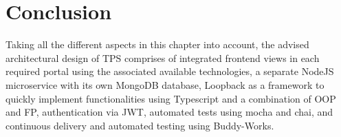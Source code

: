 %
\section{Conclusion}
Taking all the different aspects in this chapter into account, the advised architectural design of TPS comprises of integrated frontend views in each required portal using the associated available technologies, a separate NodeJS microservice with its own MongoDB database, Loopback as a framework to quickly implement functionalities using Typescript and a combination of OOP and FP, authentication via JWT, automated tests using mocha and chai, and continuous delivery and automated testing using Buddy-Works.
